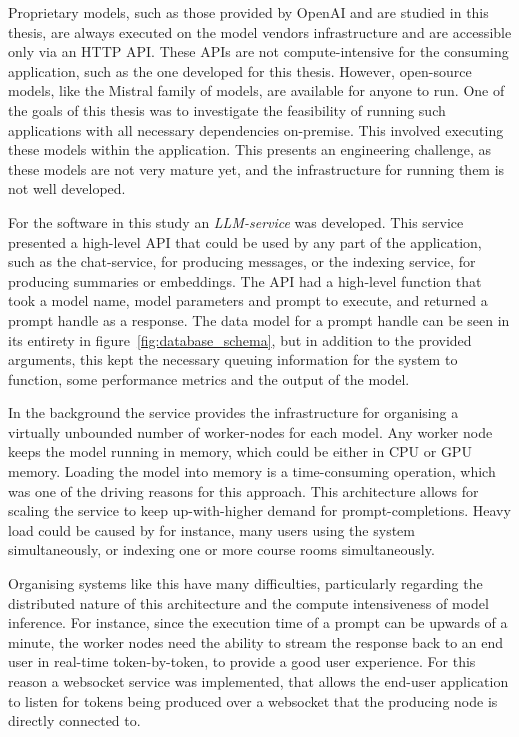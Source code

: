 Proprietary models, such as those provided by OpenAI and are studied in this thesis, are always executed on the model vendors infrastructure and are accessible only via an HTTP API. These APIs are not compute-intensive for the consuming application, such as the one developed for this thesis. However, open-source models, like the Mistral family of models, are available for anyone to run. One of the goals of this thesis was to investigate the feasibility of running such applications with all necessary dependencies on-premise. This involved executing these models within the application. This presents an engineering challenge, as these models are not very mature yet, and the infrastructure for running them is not well developed.


For the software in this study an \textit{LLM-service} was developed. This service presented a high-level API that could be used by any part of the application, such as the chat-service, for producing messages, or the indexing service, for producing summaries or embeddings. The API had a high-level function that took a model name, model parameters and prompt to execute, and returned a prompt handle as a response. The data model for a prompt handle can be seen in its entirety in figure~\ref{fig:database_schema}, but in addition to the provided arguments, this kept the necessary queuing information for the system to function, some performance metrics and the output of the model.


In the background the service provides the infrastructure for organising a virtually unbounded number of worker-nodes for each model. Any worker node keeps the model running in memory, which could be either in CPU or GPU memory. Loading the model into memory is a time-consuming operation, which was one of the driving reasons for this approach. This architecture allows for scaling the service to keep up-with-higher demand for prompt-completions. Heavy load could be caused by for instance, many users using the system simultaneously, or indexing one or more course rooms simultaneously.


Organising systems like this have many difficulties, particularly regarding the distributed nature of this architecture and the compute intensiveness of model inference. For instance, since the execution time of a prompt can be upwards of a minute, the worker nodes need the ability to stream the response back to an end user in real-time token-by-token, to provide a good user experience. For this reason a websocket service was implemented, that allows the end-user application to listen for tokens being produced over a websocket that the producing node is directly connected to.
